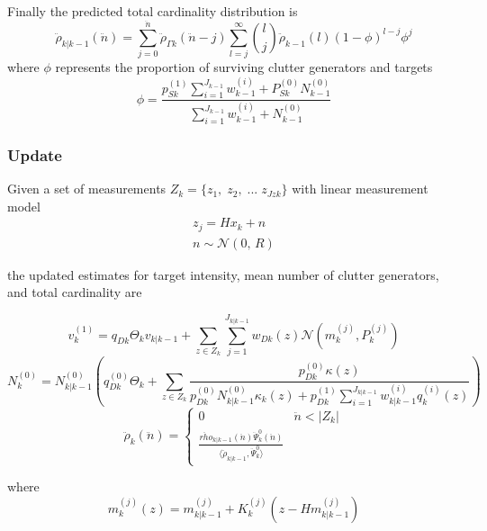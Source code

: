 \documentclass{article}
\begin{document}
Finally the predicted total cardinality distribution is
\begin{equation}
  \label{eq:rho_predict}
 \ddot{\rho}_{k|k-1}(\ddot{n}) = \sum_{j=0}^{\ddot{n}}\ddot{\rho}_{\Gamma k}(\ddot{n} - j) \sum_{l=j}^\infty {l \choose j}\ddot{\rho}_{k-1}(l)(1-\phi)^{l-j}\phi^j
\end{equation}
where $\phi$ represents the proportion of surviving clutter generators and targets
\begin{equation}
  \label{eq:phi}
  \phi = \frac{p_{Sk}^{(1)}\sum_{i=1}^{J_{k-1}}w_{k-1}^{(i)} + P_{Sk}^{(0)}N_{k-1}^{(0)}}{\sum_{i=1}^{J_{k-1}}w_{k-1}^{(i)} + N_{k-1}^{(0)}}
\end{equation}
\subsubsection*{Update}
Given a set of measurements $Z_k = \{z_1,\;z_2,\;...\;z_{Jzk}\}$ with linear measurement model
\begin{align}
  \label{eq:z}
  z_j = Hx_k + n\\
  n\sim \mathcal{N}(0,\,R)
\end{align}

the updated estimates for target intensity, mean number of clutter generators, and total cardinality are

\begin{equation}
  \label{eq:vk}
  v^{(1)}_k = q_{Dk}\Theta_kv_{k|k-1} + \sum_{z \in Z_k}\sum_{j=1}^{J_{k|k-1}}w_{Dk}(z)\mathcal{N}(m_k^{(j)},P_k^{(j)})
\end{equation}
\begin{equation}
  \label{eq:N0k}
  N_k^{(0)} = N_{k|k-1}^{(0)}\left( q_{Dk}^{(0)}\Theta_k + \sum_{z \in Z_k}\frac{p_{Dk}^{(0)}\kappa(z)}{ p_{Dk}^{(0)}N_{k|k-1}^{(0)}\kappa_k(z) +  p_{Dk}^{(1)}\sum_{i=1}^{J_{k|k-1}}w_{k|k-1}^{(i)}q_k^{(i)}(z)} \right)
\end{equation}
\begin{equation}
  \label{eq:rhok}
  \ddot{\rho}_k(\ddot{n}) =
  \begin{cases}
    0 & \ddot{n} < |Z_k| \\
    \frac{ \ddot{rho}_{k|k-1}(\ddot{n})\ddot{\Psi}_k^0(\ddot{n})}{\langle \ddot{\rho}_{k|k-1}, \ddot{\Psi}_k^0 \rangle  }
  \end{cases}
\end{equation}

where
\begin{equation}
  \label{eq:mk}
  m_k^{(j)}(z) = m_{k|k-1}^{(j)} + K_k^{(j)}(z - Hm_{k|k-1}^{(j)})
\end{equation}
\end{document}
